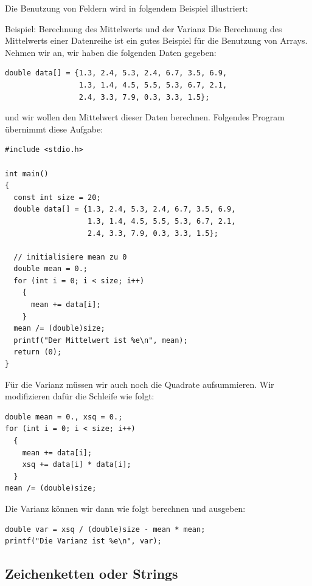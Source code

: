 Die Benutzung von Feldern wird in folgendem Beispiel illustriert:
\begin{myexampleprogram}{Beispiel: Berechnung des Mittelwerts und der Varianz}
  Die Berechnung des Mittelwerts einer Datenreihe ist ein gutes Beispiel für die Benutzung von Arrays.
  Nehmen wir an, wir haben die folgenden Daten gegeben:
\begin{lstlisting}
double data[] = {1.3, 2.4, 5.3, 2.4, 6.7, 3.5, 6.9,
                 1.3, 1.4, 4.5, 5.5, 5.3, 6.7, 2.1,
                 2.4, 3.3, 7.9, 0.3, 3.3, 1.5};
\end{lstlisting}
  und wir wollen den Mittelwert dieser Daten berechnen.
  Folgendes Program übernimmt diese Aufgabe:
\begin{lstlisting}
#include <stdio.h>

int main()
{
  const int size = 20;
  double data[] = {1.3, 2.4, 5.3, 2.4, 6.7, 3.5, 6.9,
                   1.3, 1.4, 4.5, 5.5, 5.3, 6.7, 2.1, 
                   2.4, 3.3, 7.9, 0.3, 3.3, 1.5};

  // initialisiere mean zu 0
  double mean = 0.;
  for (int i = 0; i < size; i++)
    {
      mean += data[i];
    }
  mean /= (double)size;
  printf("Der Mittelwert ist %e\n", mean);
  return (0);
}
\end{lstlisting}
  Für die Varianz müssen wir auch noch die Quadrate aufsummieren.
  Wir modifizieren dafür die Schleife wie folgt:
\begin{lstlisting}
double mean = 0., xsq = 0.;
for (int i = 0; i < size; i++)
  {
    mean += data[i];
    xsq += data[i] * data[i];
  }
mean /= (double)size;
\end{lstlisting}
  Die Varianz können wir dann wie folgt berechnen und ausgeben:
\begin{lstlisting}
double var = xsq / (double)size - mean * mean;
printf("Die Varianz ist %e\n", var);
\end{lstlisting}
\end{myexampleprogram}

\subsection{Zeichenketten oder Strings}

